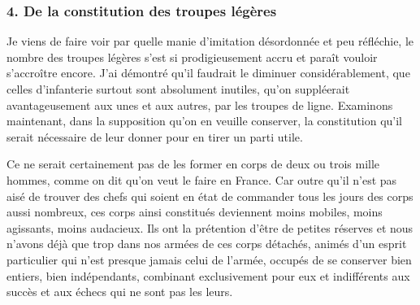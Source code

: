 \documentclass[french,twoside]{book} %
\begin{document}
\subsubsection[{4. De la constitution des troupes légères}]{4. De la constitution des troupes légères}
\noindent Je viens de faire voir par quelle manie d’imitation désordonnée et peu réfléchie, le nombre des troupes légères s’est si prodigieusement accru et paraît vouloir s’accroître encore. J’ai démontré qu’il faudrait le diminuer considérablement, que celles d’infanterie surtout sont absolument inutiles, qu’on suppléerait avantageusement aux unes et aux autres, par les troupes de ligne. Examinons maintenant, dans la supposition qu’on en veuille conserver, la constitution qu’il serait nécessaire de leur donner pour en tirer un parti utile.\par
Ce ne serait certainement pas de les former en corps de deux ou trois mille hommes, comme on dit qu’on veut le faire en France. Car outre qu’il n’est pas aisé de trouver des chefs qui soient en état de commander tous les jours des corps aussi nombreux, ces corps ainsi constitués deviennent moins mobiles, moins agissants, moins audacieux. Ils ont la prétention d’être de petites réserves et nous n’avons déjà que trop dans nos armées de ces corps détachés, animés d’un esprit particulier qui n’est presque jamais celui de l’armée, occupés de se conserver bien entiers, bien indépendants, combinant exclusivement pour eux et indifférents aux succès et aux échecs qui ne sont pas les leurs.\par
\end{document}
